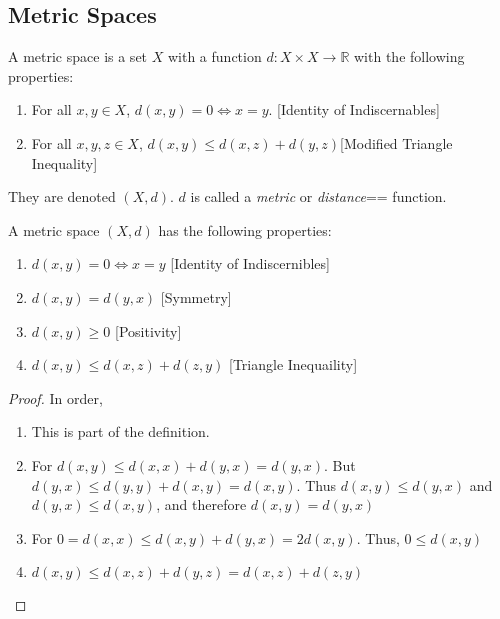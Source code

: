 \documentclass[crop=false,class=article,oneside]{standalone}
\begin{document}
        \subsection{Metric Spaces}
            \begin{definition}
            A metric space is a set $X$ with a function $d:X\times X\rightarrow \mathbb{R}$ with the following properties:
            \begin{enumerate}
            \item For all $x,y\in X$, $d(x,y) = 0\Leftrightarrow x=y$. \hfill [Identity of Indiscernables]
            \item For all $x,y,z\in X$, $d(x,y) \leq d(x,z)+d(y,z)$\hfill [Modified Triangle Inequality]
            \end{enumerate}
            They are denoted $(X,d)$. $d$ is called a
            \textit{metric} or \textit{distance}== function.
            \end{definition}
            \begin{theorem}
            A metric space $(X,d)$ has the following properties:
            \begin{enumerate}
                \item $d(x,y) = 0 \Leftrightarrow x=y$ \hfill [Identity of Indiscernibles]
                \item $d(x,y) = d(y,x)$ \hfill [Symmetry]
                \item $d(x,y) \geq 0$ \hfill [Positivity]
                \item $d(x,y) \leq d(x,z)+d(z,y)$ \hfill [Triangle Inequaility]
            \end{enumerate}
            \end{theorem}
            \begin{proof}
            In order,
            \begin{enumerate}
                \item This is part of the definition.
                \item For $d(x,y) \leq d(x,x)+d(y,x) = d(y,x)$. But $d(y,x) \leq d(y,y)+d(x,y) = d(x,y)$. Thus $d(x,y)\leq d(y,x)$ and $d(y,x) \leq d(x,y)$, and therefore $d(x,y) = d(y,x)$
                \item For $0=d(x,x) \leq d(x,y)+d(y,x) = 2d(x,y)$. Thus, $0\leq d(x,y)$
                \item $d(x,y)\leq d(x,z)+d(y,z) = d(x,z)+d(z,y)$
            \end{enumerate}
            \end{proof}
\end{document}
